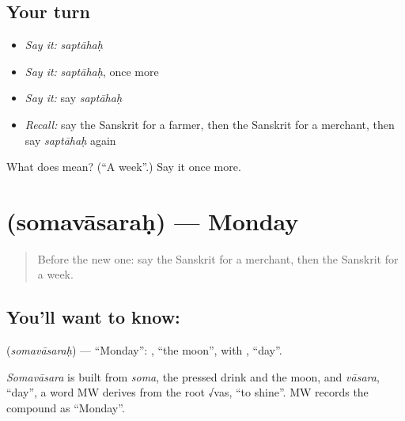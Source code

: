 \subsection*{Your turn}
\begin{itemize}
\raggedright
  \item \emph{Say it:} \emph{saptāhaḥ}
  \item \emph{Say it:} \emph{saptāhaḥ}, once more
  \item \emph{Say it:} say \emph{saptāhaḥ}
  \item \emph{Recall:} say the Sanskrit for a farmer, then the Sanskrit for a merchant, then say \emph{saptāhaḥ} again
\end{itemize}

\begin{tcolorbox}[breakable,colback=teal!4,colframe=teal!35!black,title={Before you move on}]
What does  mean? (\textquotedblleft{}A week\textquotedblright{}.) Say it once more.
\end{tcolorbox}
\section[\texorpdfstring{\sk{सोमवासरः} (somavāsaraḥ)}{सोमवासरः (somavāsaraḥ)}]{ (somavāsaraḥ) — Monday}

\label{lesson:SA-C85-monday}



\begin{quote}
Before the new one: say the Sanskrit for a merchant, then the Sanskrit for a week.
\end{quote}

\subsection*{You'll want to know: }
\textbf{} (\emph{somavāsaraḥ}) — \textquotedblleft{}Monday\textquotedblright{}: \textbf{}, \textquotedblleft{}the moon\textquotedblright{}, with \textbf{}, \textquotedblleft{}day\textquotedblright{}.

\begin{cousinweb}
\emph{Somavāsara} is built from \emph{soma}, the pressed drink and the moon, and \emph{vāsara}, \textquotedblleft{}day\textquotedblright{}, a word MW derives from the root √vas, \textquotedblleft{}to shine\textquotedblright{}. MW records the compound as \textquotedblleft{}Monday\textquotedblright{}.
\end{cousinweb}

